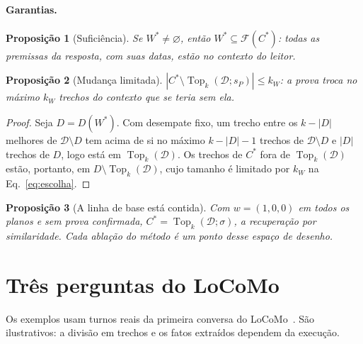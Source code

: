 \documentclass[11pt]{article}
\theoremstyle{definition}
\theoremstyle{plain}
\newtheorem{proposicao}{Proposição}
\newcommand{\D}{\mathcal{D}}          %
\newcommand{\F}{\mathcal{F}}          %
\newcommand{\Top}{\operatorname{Top}}
\begin{document}
\paragraph{Garantias.}
\begin{proposicao}[Suficiência]
Se $W^\ast\neq\varnothing$, então $W^\ast\subseteq\F(C^\ast)$: todas as
premissas da resposta, com suas datas, estão no contexto do leitor.
\end{proposicao}

\begin{proposicao}[Mudança limitada]
\label{prop:limitada}
$|C^\ast\setminus\Top_k(\D;s_P)|\le k_W$: a prova troca no máximo $k_W$
trechos do contexto que se teria sem ela.
\end{proposicao}
\begin{proof}
Seja $D=D(W^\ast)$. Com desempate fixo, um trecho entre os $k-|D|$ melhores de
$\D\setminus D$ tem acima de si no máximo $k-|D|-1$ trechos de $\D\setminus D$
e $|D|$ trechos de $D$, logo está em $\Top_k(\D)$. Os trechos de $C^\ast$ fora
de $\Top_k(\D)$ estão, portanto, em $D\setminus\Top_k(\D)$, cujo tamanho é
limitado por $k_W$ na Eq.~\eqref{eq:escolha}.
\end{proof}

\begin{proposicao}[A linha de base está contida]
Com $w=(1,0,0)$ em todos os planos e sem prova confirmada,
$C^\ast=\Top_k(\D;\sigma)$, a recuperação por similaridade. Cada ablação do
método é um ponto desse espaço de desenho.
\end{proposicao}

\section{Três perguntas do LoCoMo}
\label{sec:exemplos}

Os exemplos usam turnos reais da primeira conversa do
LoCoMo~\citep{maharana2024locomo}. São ilustrativos: a divisão em trechos e os
fatos extraídos dependem da execução.
\end{document}
